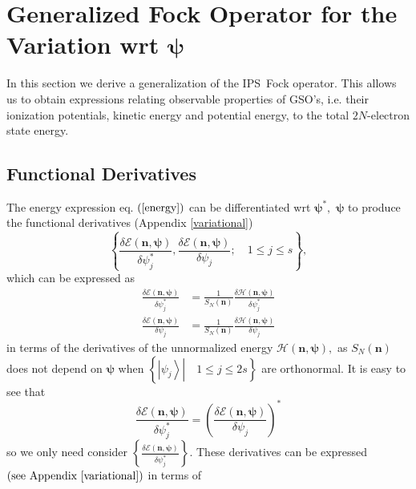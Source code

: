 \documentclass{preprint}
\begin{document}
\section{Generalized Fock Operator \label{Fock} for the Variation wrt $
\bm{\psi}$}

In this section we derive a generalization of the IPS\ Fock operator. This
allows us to obtain expressions relating observable properties of GSO's,
i.e. their ionization potentials, kinetic energy and potential energy, to
the total $2N$-electron state energy.

\subsection{Functional Derivatives\label{FD}}

The energy expression eq. $\left( \ref{energy}\right) $ can be
differentiated wrt $\bm{\psi}^{\ast},$ $\bm{\psi}$ to produce the functional
derivatives (Appendix \ref{variational})
\begin{equation}
\left\{ \frac{\delta\mathcal{E}\left( \bm{n,\psi}\right) }{\delta\psi
_{j}^{\ast}},\frac{\delta\mathcal{E}\left( \bm{n,\psi}\right) }{\delta
\psi_{j}};\quad1\leq j\leq s\right\} ,
\end{equation}
which can be expressed as%
\begin{align}
\frac{\delta\mathcal{E}\left( \bm{n,\psi}\right) }{\delta\psi_{j}^{\ast}} & =%
\frac{1}{S_{N}\left( \bm{n}\right) }\frac{\delta\mathcal{H}\left( \bm{n,\psi}%
\right) }{\delta\psi_{j}^{\ast}} \\
\frac{\delta\mathcal{E}\left( \bm{n,\psi}\right) }{\delta\psi_{j}} & =\frac{1%
}{S_{N}\left( \bm{n}\right) }\frac{\delta\mathcal{H}\left( \bm{n,\psi}%
\right) }{\delta\psi_{j}}
\end{align}
in terms of the derivatives of the unnormalized energy $\mathcal{H}\left( %
\bm{n,\psi}\right) ,$ as $S_{N}\left( \bm{n}\right) $ does not depend on $%
\bm{\psi}$ when $\left\{ \left. \left\vert \psi_{j}\right\rangle \right\vert
\quad1\leq j\leq2s\right\} $ are orthonormal. It is easy to see that
\begin{equation}
\frac{\delta\mathcal{E}\left( \bm{n,\psi}\right) }{\delta\psi_{j}^{\ast}}%
=\left( \frac{\delta\mathcal{E}\left( \bm{n,\psi}\right) }{\delta\psi_{j}}%
\right) ^{\ast}
\end{equation}
so we only need consider $\left\{ \frac{\delta\mathcal{E}\left( \bm{n,\psi}%
\right) }{\delta\psi_{j}^{\ast}}\right\} .$ These derivatives can be
expressed $\left( \text{see Appendix \ref{variational}}\right) $ in terms of
\end{document}
